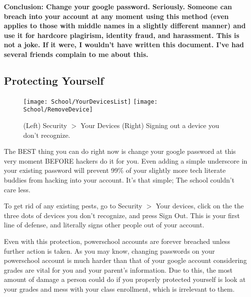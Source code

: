 \textbf{Conclusion: Change your google password. Seriously. Someone can breach into your account at any moment using this method (even applies to those with middle names in a slightly different manner) and use it for hardcore plagirism, identity fraud, and harassment. This is not a joke. If it were, I wouldn't have written this document. I've had several friends complain to me about this.}

\subsection*{Protecting Yourself}

\begin{figure}[h]
    \centering
    \texttt{[image: School/YourDevicesList]}
    \texttt{[image: School/RemoveDevice]}
    \caption{
        (Left) Security $>$ Your Devices (Right) Signing out a device you don't recognize.
    }
\end{figure}

The BEST thing you can do right now is change your google password at this very moment BEFORE hackers do it for you. Even adding a simple underscore in your existing password will prevent 99\% of your slightly more tech literate buddies from hacking into your account. It's that simple; The school couldn't care less.

To get rid of any existing pests, go to Security $>$ Your devices, click on the the three dots of devices you don't recognize, and press Sign Out. This is your first line of defense, and literally signs other people out of your account.

Even with this protection, powerschool accounts are forever breached unless further action is taken. As you may know, changing passwords on your powerschool account is much harder than that of your google account considering grades are vital for you and your parent's information. Due to this, the most amount of damage a person could do if you properly protected yourself is look at your grades and mess with your class enrollment, which is irrelevant to them.
